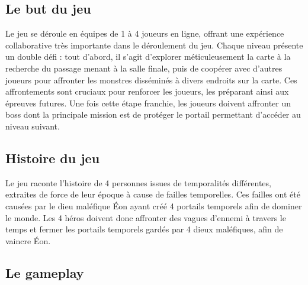 \documentclass{article}
\begin{document}
\subsection{Le but du jeu}
Le jeu se déroule en équipes de 1 à 4 joueurs en ligne, offrant une expérience collaborative très importante dans le déroulement du jeu. Chaque niveau présente un double défi : tout d'abord, il s'agit d'explorer méticuleusement la carte à la recherche du passage menant à la salle finale, puis de coopérer avec d'autres joueurs pour affronter les monstres disséminés à divers endroits sur la carte. Ces affrontements sont cruciaux pour renforcer les joueurs, les préparant ainsi aux épreuves futures. Une fois cette étape franchie, les joueurs doivent affronter un boss dont la principale mission est de protéger le portail permettant d'accéder au niveau suivant.
\subsection{Histoire du jeu}
Le jeu raconte l'histoire de 4 personnes issues de temporalités différentes, extraites de force de leur époque à cause de failles temporelles. Ces failles ont été causées par le dieu maléfique Éon ayant créé 4 portails temporels afin de dominer le monde. Les 4 héros doivent donc affronter des vagues d'ennemi à travers le temps et fermer les portails temporels gardés par 4 dieux maléfiques, afin de vaincre Éon.
\subsection{Le gameplay}
\end{document}
